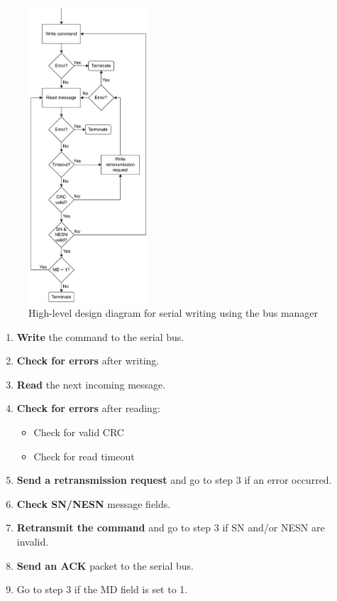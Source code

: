 \begin{figure}[H]
	\centering
	\includegraphics[width=0.4\textwidth]{figures/Bus_manager_diagram.pdf}
    \caption{High-level design diagram for serial writing using the bus manager}
    \label{fig:read_write_design}
\end{figure}

\begin{enumerate}
	\item \textbf{Write} the command to the serial bus.
	\item \textbf{Check for errors} after writing.
	\item \textbf{Read} the next incoming message.
	\item \textbf{Check for errors} after reading:
	\begin{itemize}
		\item Check for valid CRC
		\item Check for read timeout
	\end{itemize}
	\item \textbf{Send a retransmission request} and go to step 3 if an error occurred.
	\item \textbf{Check SN/NESN} message fields.
	\item \textbf{Retransmit the command} and go to step 3 if SN and/or NESN are invalid.
	\item \textbf{Send an ACK} packet to the serial bus.
	\item Go to step 3 if the MD field is set to 1.
\end{enumerate}

